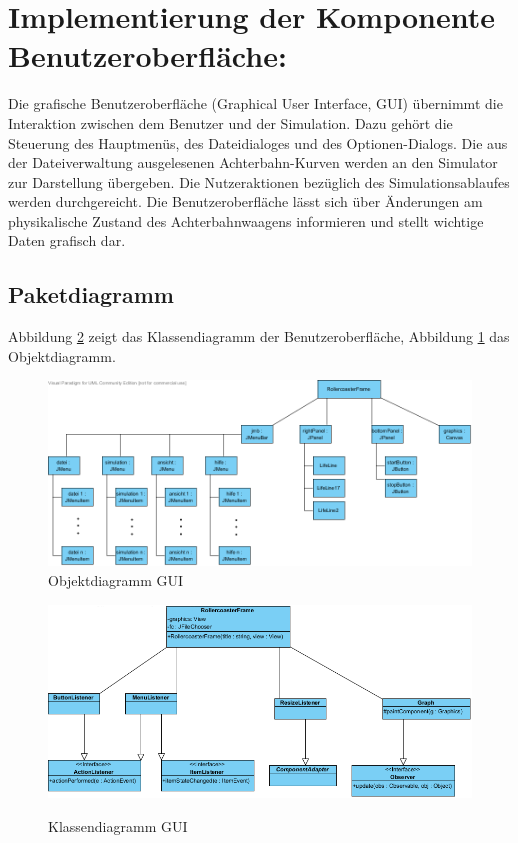 
\section{Implementierung der Komponente Benutzeroberfläche:}

Die grafische Benutzeroberfläche (Graphical User Interface, GUI) übernimmt 
die Interaktion zwischen dem Benutzer und der Simulation.
Dazu gehört die Steuerung des Hauptmenüs, des Dateidialoges und
des Optionen-Dialogs. Die aus der Dateiverwaltung ausgelesenen Achterbahn-Kurven 
werden an den Simulator zur Darstellung übergeben. Die Nutzeraktionen bezüglich des
Simulationsablaufes werden durchgereicht. Die Benutzeroberfläche lässt sich über
Änderungen am physikalische Zustand des Achterbahnwaagens informieren und stellt
wichtige Daten grafisch dar.

\subsection{Paketdiagramm}

Abbildung \ref{fig:guiClasses} zeigt das Klassendiagramm der Benutzeroberfläche,
Abbildung \ref{fig:guiObjects} das Objektdiagramm.

\begin{figure}
\includegraphics[width=\linewidth]{bilder/GUI_Objektdiagramm}
\caption{Objektdiagramm GUI}
\label{fig:guiObjects}
\end{figure}
\begin{figure}
\includegraphics[width=\linewidth]{bilder/GUI_Klassendiagramm}
\label{fig:guiClasses}
\caption{Klassendiagramm GUI}
\end{figure}

